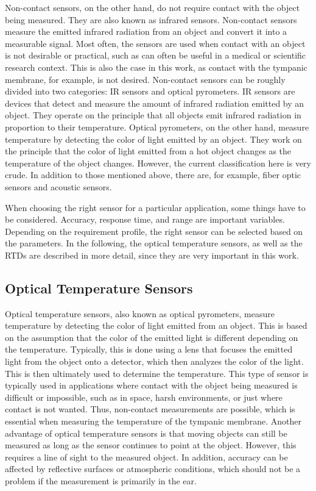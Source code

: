 Non-contact sensors, on the other hand, do not require contact with the object being measured. They are also known as infrared sensors.
Non-contact sensors measure the emitted infrared radiation from an object and convert it into a measurable signal.
Most often, the sensors are used when contact with an object is not desirable or practical, such as can often be useful in a medical or scientific research context. 
This is also the case in this work, as contact with the tympanic membrane, for example, is not desired.
Non-contact sensors can be roughly divided into two categories: IR sensors and optical pyrometers.
IR sensors are devices that detect and measure the amount of infrared radiation emitted by an object. They operate on the principle that all objects emit infrared radiation in proportion to their temperature. 
Optical pyrometers, on the other hand, measure temperature by detecting the color of light emitted by an object. They work on the principle that the color of light emitted from a hot object changes as the temperature of the object changes.
However, the current classification here is very crude.
In addition to those mentioned above, there are, for example, fiber optic sensors and acoustic sensors.

When choosing the right sensor for a particular application, some things have to be considered.
Accuracy, response time, and range are important variables.
Depending on the requirement profile, the right sensor can be selected based on the parameters.
In the following, the optical temperature sensors, as well as the RTDs are described in more detail, since they are very important in this work.

\subsection{Optical Temperature Sensors}
\label{Background:TemperatureSensors:OpticalTS}
Optical temperature sensors, also known as optical pyrometers, measure temperature by detecting the color of light emitted from an object. 
This is based on the assumption that the color of the emitted light is different depending on the temperature.
Typically, this is done using a lens that focuses the emitted light from the object onto a detector, which then analyzes the color of the light. 
This is then ultimately used to determine the temperature.
This type of sensor is typically used in applications where contact with the object being measured is difficult or impossible, such as in space, harsh environments, or just where contact is not wanted.
Thus, non-contact measurements are possible, which is essential when measuring the temperature of the tympanic membrane.
Another advantage of optical temperature sensors is that moving objects can still be measured as long as the sensor continues to point at the object.
However, this requires a line of sight to the measured object.
In addition, accuracy can be affected by reflective surfaces or atmospheric conditions, which should not be a problem if the measurement is primarily in the ear.

